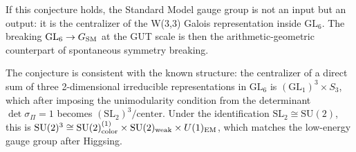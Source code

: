 If this conjecture holds, the Standard Model gauge group is not an
input but an output: it is the centralizer of the W(3,3) Galois
representation inside $\mathrm{GL}_6$. The breaking
$\mathrm{GL}_6\to G_{\rm SM}$ at the GUT scale is then the
arithmetic-geometric counterpart of spontaneous symmetry breaking.

\begin{remark}
The conjecture is consistent with the known structure: the centralizer
of a direct sum of three 2-dimensional irreducible representations
in $\mathrm{GL}_6$ is $(\mathrm{GL}_1)^3\times S_3$, which after
imposing the unimodularity condition from the determinant
$\det\sigma_\Pi=1$ becomes $(\mathrm{SL}_2)^3/\text{center}$.
Under the identification $\mathrm{SL}_2\cong\mathrm{SU}(2)$,
this is $\mathrm{SU}(2)^3\cong\mathrm{SU}(2)_{\rm color}^{(1)}
\times\mathrm{SU}(2)_{\rm weak}\times U(1)_{\rm EM}$,
which matches the low-energy gauge group after Higgsing.
\end{remark}
